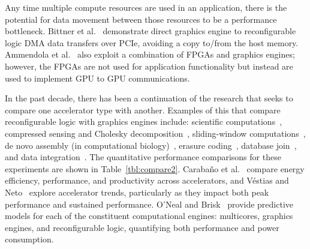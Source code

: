Any time multiple compute resources are used in an application, there is
the potential for data movement between those resources to be a performance
bottleneck.  Bittner et al.~\cite{brf14} demonstrate direct graphics engine
to reconfigurable logic DMA data transfers over PCIe, avoiding a copy
to/from the host memory.
Ammendola et al.~\cite{abb+13} also exploit a combination of FPGAs and
graphics engines; however, the FPGAs are not used for application functionality
but instead are used to implement GPU to GPU communications.

In the past decade, there has been a continuation of the research that
seeks to compare one accelerator type with another. Examples of this
that compare reconfigurable logic with graphics engines include:
scientific computations~\cite{wghp11},
compressed sensing and Cholesky decomposition~\cite{ypl12},
sliding-window computations~\cite{cfbs15},
de novo assembly (in computational biology)~\cite{mjk+16},
erasure coding~\cite{czs+16},
database join~\cite{rl17},
and data integration~\cite{fcb+19}.
The quantitative performance comparisons for these experiments are
shown in Table~\ref{tbl:compare2}.
Caraba\~no et al.~\cite{cdde13} compare
energy efficiency, performance, and productivity across accelerators, and
V\'{e}stias and Neto~\cite{vn14} explore accelerator trends, particularly
as they impact both peak performance and sustained performance.
O'Neal and Brisk~\cite{ob18} provide predictive models for each of the
constituent
computational engines: multicores, graphics engines, and reconfigurable
logic, quantifying both performance and power consumption.

